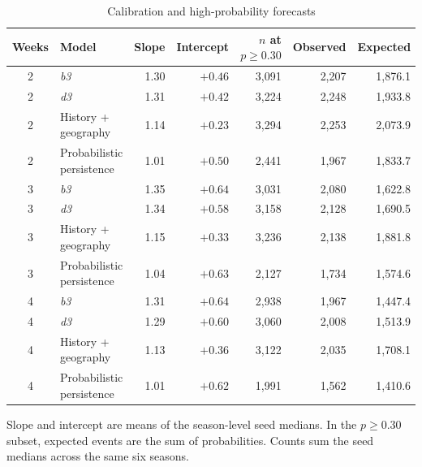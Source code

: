 \documentclass[10pt]{article}
\newcommand{\bthree}{\textit{b3}}
\newcommand{\dthree}{\textit{d3}}
\begin{document}
\begin{table}[!h]
\centering
\caption{Calibration and high-probability forecasts}
\small
\begin{tabular}{@{}clrrrrr@{}}
\toprule
Weeks & Model & Slope & Intercept & $n$ at $p\geq 0.30$ & Observed & Expected\\
\midrule
2 & \bthree{} & 1.30 & $+0.46$ & 3,091 & 2,207 & 1,876.1\\
2 & \dthree{} & 1.31 & $+0.42$ & 3,224 & 2,248 & 1,933.8\\
2 & History + geography & 1.14 & $+0.23$ & 3,294 & 2,253 & 2,073.9\\
2 & Probabilistic persistence & 1.01 & $+0.50$ & 2,441 & 1,967 & 1,833.7\\
3 & \bthree{} & 1.35 & $+0.64$ & 3,031 & 2,080 & 1,622.8\\
3 & \dthree{} & 1.34 & $+0.58$ & 3,158 & 2,128 & 1,690.5\\
3 & History + geography & 1.15 & $+0.33$ & 3,236 & 2,138 & 1,881.8\\
3 & Probabilistic persistence & 1.04 & $+0.63$ & 2,127 & 1,734 & 1,574.6\\
4 & \bthree{} & 1.31 & $+0.64$ & 2,938 & 1,967 & 1,447.4\\
4 & \dthree{} & 1.29 & $+0.60$ & 3,060 & 2,008 & 1,513.9\\
4 & History + geography & 1.13 & $+0.36$ & 3,122 & 2,035 & 1,708.1\\
4 & Probabilistic persistence & 1.01 & $+0.62$ & 1,991 & 1,562 & 1,410.6\\
\bottomrule
\end{tabular}

\vspace{2pt}\parbox{0.85\textwidth}{\footnotesize Slope and intercept are means of the season-level seed medians. In the $p\geq 0.30$ subset, expected events are the sum of probabilities. Counts sum the seed medians across the same six seasons.}
\end{table}
\end{document}
